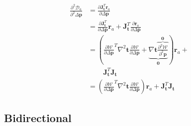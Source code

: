\begin{equation}
    \begin{aligned}
		\frac{\partial^2 \mathcal{D}_a}{\partial^2 \Delta \mathbf{p}} & =  \frac{\partial \mathbf{J}_{\mathbf{t}}^T \mathbf{r}_a}{\partial \Delta \mathbf{p}}
		\\
		& = \frac{\partial \mathbf{J}_{\mathbf{t}}^T}{\partial \Delta \mathbf{p}} \mathbf{r}_a + \mathbf{J}_{\mathbf{t}}^T \frac{\partial \mathbf{r}_a}{\partial \Delta \mathbf{p}}
		\\
		& = \left( \frac{\partial\mathcal{W}}{\partial \Delta \mathbf{p}}^T \nabla^2 \mathbf{t} \frac{\partial\mathcal{W}}{\partial \Delta \mathbf{p}} + \underbrace{\nabla \mathbf{t} \overbrace{\frac{\partial^2 \mathcal{W}}{\partial^2 \mathbf{p}}}^{\mathbf{0}}}_{\mathbf{0}} \right) \mathbf{r}_a +
		\\
		& \qquad \, \mathbf{J}_{\mathbf{t}}^T \mathbf{J}_{\mathbf{t}}
		\\
		& = \left( \frac{\partial\mathcal{W}}{\partial \Delta \mathbf{p}}^T \nabla^2 \mathbf{t} \frac{\partial\mathcal{W}}{\partial \Delta \mathbf{p}} \right) \mathbf{r}_a + \mathbf{J}_{\mathbf{t}}^T \mathbf{J}_{\mathbf{t}}
    \label{eq:asymmetric_hessian_term3}
    \end{aligned}
\end{equation}


\subsection{Bidirectional}
\label{sec:app12}

